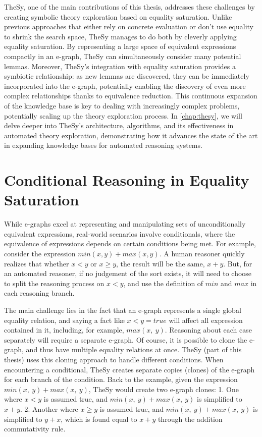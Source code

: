TheSy, one of the main contributions of this thesis, addresses these challenges by creating symbolic theory exploration based on equality saturation.
Unlike previous approaches that either rely on concrete evaluation or don't use equality to shrink the search space, TheSy manages to do both by cleverly applying equality saturation.
By representing a large space of equivalent expressions compactly in an e-graph, TheSy can simultaneously consider many potential lemmas. 
Moreover, TheSy's integration with equality saturation provides a symbiotic relationship: as new lemmas are discovered, they can be immediately incorporated into the e-graph, potentially enabling the discovery of even more complex relationships thanks to equivalence reduction. 
This continuous expansion of the knowledge base is key to dealing with increasingly complex problems, potentially scaling up the theory exploration process.
In \autoref{chap:thesy}, we will delve deeper into TheSy's architecture, algorithms, and its effectiveness in automated theory exploration, demonstrating how it advances the state of the art in expanding knowledge bases for automated reasoning systems.


\section{Conditional Reasoning in Equality Saturation}

While e-graphs excel at representing and manipulating sets of unconditionally equivalent expressions,
real-world scenarios involve conditionals, where the equivalence of expressions depends on certain conditions being met. 
For example, consider the expression $min(x,y) + max(x,y)$.
A human reasoner quickly realizes that whether $x < y$ or $x \geq y$, the result will be the same, $x + y$.
But, for an automated reasoner, if no judgement of the sort exists, it will need to choose to split the reasoning process on $x < y$, and use the definition of $min$ and $max$ in each reasoning branch.

The main challenge lies in the fact that an e-graph represents a single global equality relation, and saying a fact like $x < y = true$ will affect all expression contained in it, including, for example, $max(x,~y)$.
Reasoning about each case separately will require a separate e-graph.
Of course, it is possible to clone the e-graph,
and thus have multiple equality relations at once.
TheSy \cite{thesy} (part of this thesis) uses this cloning approach to handle different conditions. 
When encountering a conditional, TheSy creates separate copies (clones) of the e-graph for each branch of the condition.
Back to the example, given the expression $min(x,~y) + max(x,~y)$, TheSy would create two e-graph clones:
1. One where $x < y$ is assumed true, and $min(x,~y) + max(x,~y)$ is simplified to $x + y$.
2. Another where $x \geq y$ is assumed true, and $min(x,~y) + max(x,~y)$ is simplified to $y + x$, which is found equal to $x + y$ through the addition commutativity rule.

